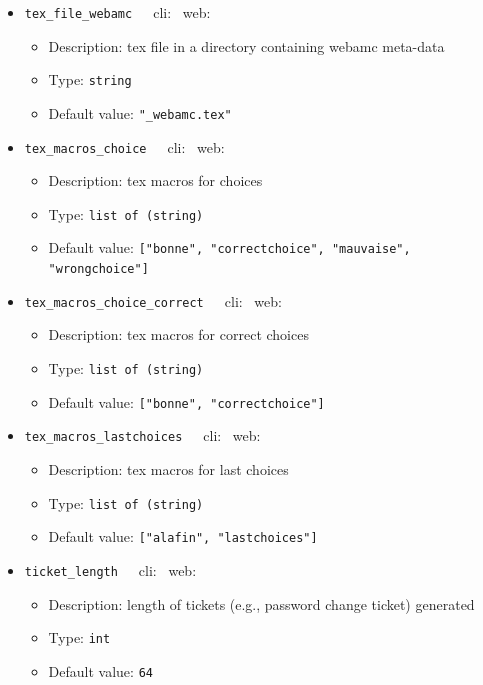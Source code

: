 {\begin{itemize}[itemsep=0pt,parsep=0pt,topsep=0pt,partopsep=0pt]
\begin{itemize}[itemsep=0pt,parsep=0pt,topsep=0pt,partopsep=0pt]
  \item Type:  {\tt{string}}
  \item Default value:  {\tt{"qst-"}}
  \end{itemize}
\item{\tt{tex\_file\_webamc}}~~~cli: \cmark~web: \xmark
  \begin{itemize}[itemsep=0pt,parsep=0pt,topsep=0pt,partopsep=0pt]
  \item Description:  tex file in a directory containing webamc meta-data
  \item Type:  {\tt{string}}
  \item Default value:  {\tt{"\_webamc.tex"}}
  \end{itemize}
\item{\tt{tex\_macros\_choice}}~~~cli: \cmark~web: \xmark
  \begin{itemize}[itemsep=0pt,parsep=0pt,topsep=0pt,partopsep=0pt]
  \item Description:  tex macros for choices
  \item Type:  {\tt{list of (string)}}
  \item Default value:  {\tt{["bonne", "correctchoice", "mauvaise", "wrongchoice"]}}
  \end{itemize}
\item{\tt{tex\_macros\_choice\_correct}}~~~cli: \cmark~web: \xmark
  \begin{itemize}[itemsep=0pt,parsep=0pt,topsep=0pt,partopsep=0pt]
  \item Description:  tex macros for correct choices
  \item Type:  {\tt{list of (string)}}
  \item Default value:  {\tt{["bonne", "correctchoice"]}}
  \end{itemize}
\item{\tt{tex\_macros\_lastchoices}}~~~cli: \cmark~web: \xmark
  \begin{itemize}[itemsep=0pt,parsep=0pt,topsep=0pt,partopsep=0pt]
  \item Description:  tex macros for last choices
  \item Type:  {\tt{list of (string)}}
  \item Default value:  {\tt{["alafin", "lastchoices"]}}
  \end{itemize}
\item{\tt{ticket\_length}}~~~cli: \xmark~web: \cmark
  \begin{itemize}[itemsep=0pt,parsep=0pt,topsep=0pt,partopsep=0pt]
  \item Description:  length of tickets (e.g., password change ticket) generated
  \item Type:  {\tt{int}}
  \item Default value:  {\tt{64}}
  \end{itemize}
\end{itemize}}
